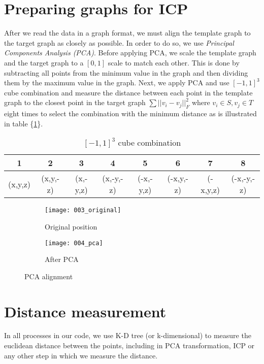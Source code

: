 \documentclass[../structure.tex]{subfiles}
\begin{document}
\section{Preparing graphs for ICP}
After we read the data in a graph format, we must align the template graph to the target graph as closely as possible. In order to do so, we use \textit{Principal Components Analysis (PCA)}. Before applying PCA, we scale the template graph and the target graph to a $[0,1]$ scale to match each other. This is done by subtracting all points from the minimum value in the graph and then dividing them by the maximum value in the graph. Next, we apply PCA and use $[-1,1]^3$ cube combination and measure the distance between each point in the template graph to the closest point in the target graph $\sum ||v_i-v_j||_F^2$ where $v_i \in S, v_j \in T$ eight times to select the combination with the minimum distance as is illustrated in table \{\ref{table:cube}\}.
\begin{center}
\begin{table}[h]
	\begin{tabular}{| c | c | c | c | c | c | c | c |}
	\hline
	1 & 2 & 3 & 4 & 5 & 6 & 7 & 8\\
	\hline
	(x,y,z) & (x,y,-z) & (x,-y,z) & (x,-y,-z) & (-x,-y,z) & (-x,y,-z) & (-x,y,z) & (-x,-y,-z)\\
	\hline
	\end{tabular}
\caption{$[-1,1]^3$ cube combination}
\label{table:cube}
\end{table}
\end{center}

\begin{figure}[h!]
	\centering
	\begin{subfigure}[b]{0.59\textwidth}
	\texttt{[image: 003\_original]}
	\caption{Original position}
	\end{subfigure}
	\begin{subfigure}[b]{0.39\textwidth}
	\texttt{[image: 004\_pca]}
	\caption{After PCA}
	\end{subfigure}
\label{fig:pca}
\caption{PCA alignment}
\end{figure}

\section{Distance measurement}
In all processes in our code, we use K-D tree (or k-dimensional) to measure the euclidean distance between the points, including in PCA transformation, ICP or any other step in which we measure the distance.
\end{document}
